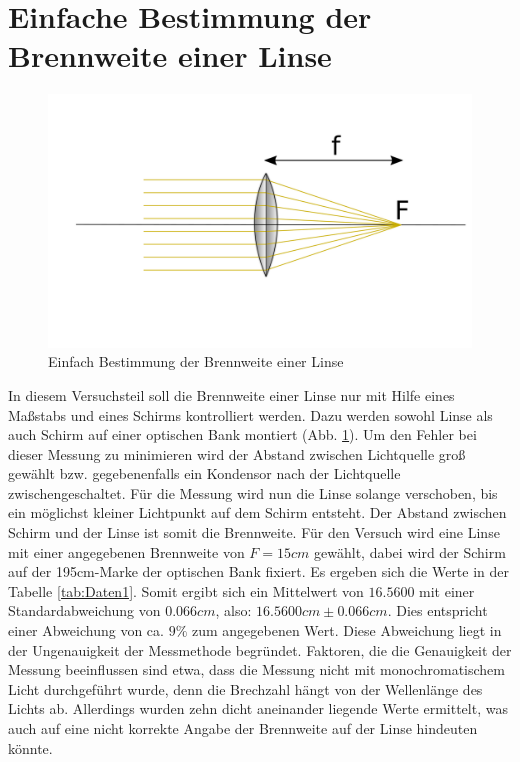 \section{Einfache Bestimmung der Brennweite einer Linse}

\begin{figure}[ht]
    \centering
    \includegraphics[scale=0.8]{Geometrische_Optik/Protokoll/fig/Versuch1.1.png}
    \caption{Einfach Bestimmung der Brennweite einer Linse}
    \label{fig:Versuch1.1}
\end{figure}

In diesem Versuchsteil soll die Brennweite einer Linse nur mit Hilfe eines Maßstabs und eines Schirms kontrolliert werden. Dazu werden sowohl Linse als auch Schirm auf einer optischen Bank montiert (Abb. \ref{fig:Versuch1.1}). Um den Fehler bei dieser Messung zu minimieren wird der Abstand zwischen Lichtquelle groß gewählt bzw. gegebenenfalls ein Kondensor nach der Lichtquelle zwischengeschaltet. Für die Messung wird nun die Linse solange verschoben, bis ein möglichst kleiner Lichtpunkt auf dem Schirm entsteht. Der Abstand zwischen Schirm und der Linse ist somit die Brennweite. Für den Versuch wird eine Linse mit einer angegebenen Brennweite von $F = 15 cm$ gewählt, dabei wird der Schirm auf der 195cm-Marke der optischen Bank fixiert. Es ergeben sich die Werte in der Tabelle \ref{tab:Daten1}. Somit ergibt sich ein Mittelwert von $16.5600$ mit einer Standardabweichung von $0.066cm$, also: $16.5600cm \pm 0.066cm$. Dies entspricht einer Abweichung von ca. $9 \% $ zum angegebenen Wert. Diese Abweichung liegt in der Ungenauigkeit der Messmethode begründet. Faktoren, die die Genauigkeit der Messung beeinflussen sind etwa, dass die Messung nicht mit monochromatischem Licht durchgeführt wurde, denn die Brechzahl hängt von der Wellenlänge des Lichts ab. Allerdings wurden zehn dicht aneinander liegende Werte ermittelt, was auch auf eine nicht korrekte Angabe der Brennweite auf der Linse hindeuten könnte.
 
